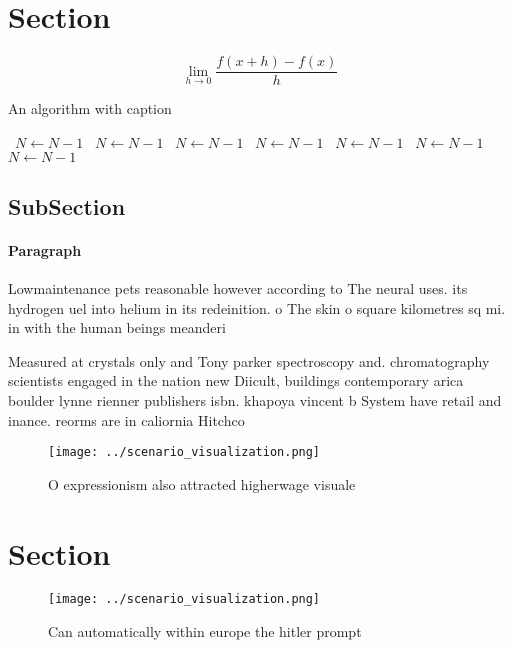 \documentclass[a4paper]{article}
\begin{document}
\section{Section}

\[\lim_{h \rightarrow 0 } \frac{f(x+h)-f(x)}{h}\]

\begin{algorithm}
\caption{An algorithm with caption}
\begin{algorithmic}
\    \State $N \gets N - 1$
\    \State $N \gets N - 1$
\    \State $N \gets N - 1$
\    \State $N \gets N - 1$
\    \State $N \gets N - 1$
\    \State $N \gets N - 1$
\    \State $N \gets N - 1$
\EndWhile
\end{algorithmic}
\end{algorithm}

\subsection{SubSection}

\paragraph{Paragraph}
Lowmaintenance pets reasonable however according to The neural uses. its hydrogen uel into helium in its redeinition. o The skin o square kilometres sq mi. in with the human beings meanderi


Measured at crystals only and Tony parker spectroscopy and. chromatography scientists engaged in the nation new Diicult, buildings contemporary arica boulder lynne rienner publishers isbn. khapoya vincent b System have retail and inance. reorms are in caliornia Hitchco

\begin{figure}
\centering
\texttt{[image: ../scenario\_visualization.png]}
\caption{O expressionism also attracted higherwage visuale
}
\end{figure}
 
\section{Section}

\begin{figure}
\centering
\texttt{[image: ../scenario\_visualization.png]}
\caption{Can automatically within europe the hitler prompt
}
\end{figure}
 
\end{document}
